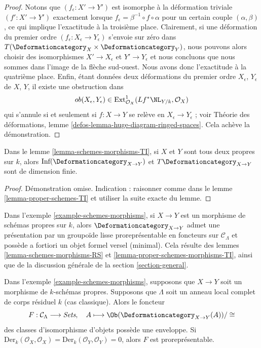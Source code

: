 \begin{proof}
Notons que $(f_\epsilon : X' \to Y')$ est isomorphe à la
déformation triviale $(f' : X' \to Y')$ exactement lorsque
$f_\epsilon  = \beta^{-1} \circ f \circ \alpha$ pour un certain
couple $(\alpha, \beta)$, ce qui implique l'exactitude à la troisième place.
Clairement, si une déformation du premier ordre
$(f_\epsilon : X_\epsilon \to Y_\epsilon)$
s'envoie sur zéro dans $T(\Deformationcategory_X \times \Deformationcategory_Y)$,
nous pouvons alors choisir des isomorphismes $X' \to X_\epsilon$ et $Y' \to Y_\epsilon$
et nous concluons que nous sommes dans l'image de la flèche sud-ouest.
Nous avons donc l'exactitude à la quatrième place.
Enfin, étant données deux déformations du premier ordre $X_\epsilon$, $Y_\epsilon$
de $X$, $Y$, il existe une obstruction dans
$$
ob(X_\epsilon, Y_\epsilon) \in
\text{Ext}^1_{\mathcal{O}_X}(Lf^*\NL_{Y/k}, \mathcal{O}_X)
$$
qui s'annule si et seulement si $f : X \to Y$ se relève en
$X_\epsilon \to Y_\epsilon$ ; voir
Théorie des déformations, lemme \ref{defos-lemma-huge-diagram-ringed-spaces}.
Cela achève la démonstration.
\end{proof}

\begin{lemma}
\label{lemma-proper-schemes-morphisms-TI}
Dans le lemme \ref{lemma-schemes-morphisms-TI}, si $X$ et $Y$ sont tous deux
propres sur $k$, alors
$\text{Inf}(\Deformationcategory_{X \to Y})$ et
$T\Deformationcategory_{X \to Y}$ sont de dimension finie.
\end{lemma}

\begin{proof}
Démonstration omise. Indication : raisonner comme dans le lemme \ref{lemma-proper-schemes-TI}
et utiliser la suite exacte du lemme.
\end{proof}

\noindent
Dans l'exemple \ref{example-schemes-morphisms},
si $X \to Y$ est un morphisme de schémas propres sur $k$,
alors $\Deformationcategory_{X \to Y}$
admet une présentation par un groupoïde lisse proreprésentable en foncteurs
sur $\mathcal{C}_\Lambda$
et possède a fortiori un objet formel versel (minimal). Cela résulte
des lemmes \ref{lemma-schemes-morphisms-RS} et
\ref{lemma-proper-schemes-morphisms-TI},
ainsi que de la discussion générale de la section \ref{section-general}.

\begin{lemma}
\label{lemma-schemes-morphisms-hull}
Dans l'exemple \ref{example-schemes-morphisms}, supposons que $X \to Y$
soit un morphisme de $k$-schémas propres.
Supposons que $\Lambda$ soit un anneau local complet de corps résiduel $k$
(cas classique). Alors le foncteur
$$
F : \mathcal{C}_\Lambda \longrightarrow \textit{Sets},\quad
A \longmapsto \Ob(\Deformationcategory_{X \to Y}(A))/\cong
$$
des classes d'isomorphisme d'objets possède une enveloppe. Si
$\text{Der}_k(\mathcal{O}_X, \mathcal{O}_X) =
\text{Der}_k(\mathcal{O}_Y, \mathcal{O}_Y) = 0$, alors
$F$ est proreprésentable.
\end{lemma}

